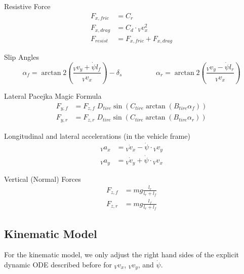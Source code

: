 \documentclass[
a4paper, %
10pt, %
notitlepage,
english]{CSUniSchoolLabReport}
\begin{document}
Resistive Force
\begin{align}
	F_{x, fric} &= C_r \\
	F_{x, drag} &= C_{d} \cdot {}_V v^2_x \\
	F_{resist} &= F_{x, fric} + F_{x, drag}
\end{align}
	
Slip Angles
\begin{equation}
	\alpha_f = \arctan2\left(\frac{{}_Vv_y + \dot{\psi} l_f}{{}_Vv_x}\right) - \delta_s
	\hspace{2cm}
	\alpha_r = \arctan2\left(\frac{{}_Vv_y - \dot{\psi} l_r}{{}_Vv_x}\right) 
\end{equation}

Lateral Pacejka Magic Formula
\begin{align}
	F_{y, f} &= F_{z, f} \; D_{tire} \sin\left(C_{tire} \arctan(B_{tire}\alpha_f)\right) \\
	F_{y, r} &= F_{z, r} \; D_{tire} \sin\left(C_{tire} \arctan(B_{tire}\alpha_r)\right)
\end{align}

Longitudinal and lateral accelerations (in the vehicle frame)
\begin{align}
	{}_V a_x &= {}_V\dot{v}_x - \dot{\psi} \cdot {}_V v_y \\
	{}_V a_y &= {}_V\dot{v}_y + \dot{\psi} \cdot {}_V v_x
\end{align}

Vertical (Normal) Forces
\begin{align}
	F_{z, f} &= m g \frac{l_r}{l_r+l_f}\\
	F_{z, r} &= m g \frac{l_f}{l_r+l_f}
\end{align}

\subsection{Kinematic Model}

For the kinematic model, we only adjust the right hand sides of the explicit dynamic ODE described before for ${}_Vv_x$, ${}_Vv_y$, and $\dot{\psi}$.
\end{document}
